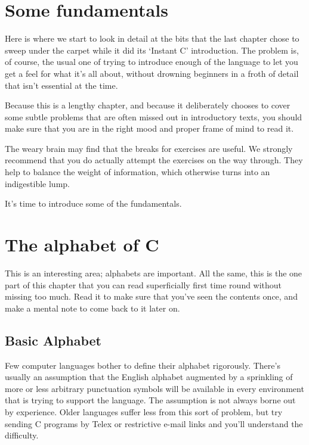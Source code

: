         \section{Some fundamentals}
        

  

  Here is where we start to look in detail at the bits that the last
   chapter chose to sweep under the carpet while it did its
   `Instant C' introduction. The problem is, of course, the usual
   one of trying to introduce enough of the language to let you get a feel for
   what it's all about, without drowning beginners in a froth of detail that
   isn't essential at the time.


  Because this is a lengthy chapter, and because it deliberately chooses to
   cover some subtle problems that are often missed out in introductory texts,
   you should make sure that you are in the right mood and proper frame of
   mind to read it.


  The weary brain may find that the breaks for exercises are useful. We
   strongly recommend that you do actually attempt the exercises on the way
   through. They help to balance the weight of information, which otherwise
   turns into an indigestible lump.


  It's time to introduce some of the fundamentals.


 
        \section{The alphabet of C}
        

  

  This is an interesting area; alphabets are important. All the same, this
   is the one part of this chapter that you can read superficially first time
   round without missing too much. Read it to make sure that you've seen the
   contents once, and make a mental note to come back to it later on.


  \subsection{Basic Alphabet}\label{subsec:alpha}
   

   Few computer languages bother to define their alphabet rigorously.
    There's usually an assumption that the English alphabet augmented by a
    sprinkling of more or less arbitrary punctuation symbols will be available
    in every environment that is trying to support the language. The
    assumption is not always borne out by experience. Older languages suffer
    less from this sort of problem, but try sending C programs by Telex
    or restrictive e-mail links and you'll understand the difficulty.


